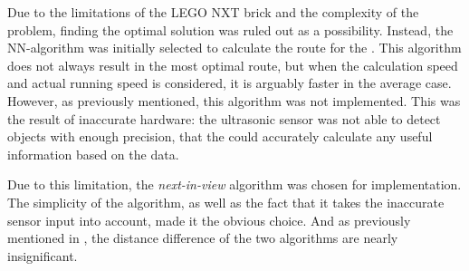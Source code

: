 Due to the limitations of the LEGO NXT brick and the complexity of the problem, finding the optimal solution was ruled out as a possibility. Instead, the NN-algorithm was initially selected to calculate the route for the \projname{}. This algorithm does not always result in the most optimal route, but when the calculation speed and actual running speed is considered, it is arguably faster in the average case. However, as previously mentioned, this algorithm was not implemented. This was the result of inaccurate hardware: the ultrasonic sensor was not able to detect objects with enough precision, that the \projname{} could accurately calculate any useful information based on the data.

Due to this limitation, the \emph{next-in-view} algorithm was chosen for implementation. The simplicity of the algorithm, as well as the fact that it takes the inaccurate sensor input into account, made it the obvious choice. And as previously mentioned in , the distance difference of the two algorithms are nearly insignificant.
